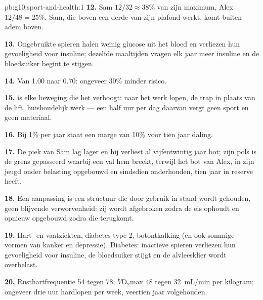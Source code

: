 \begin{solution}{pb:g10:sport-and-health:1}
\textbf{12.} Sam $12/32 \approx 38\%$ van zijn maximum, Alex $12/48 =
25\%$. Sam, die boven een derde van zijn plafond werkt, komt buiten adem
boven.

\textbf{13.} Ongebruikte spieren halen weinig glucose uit het bloed en
verliezen hun gevoeligheid voor insuline; dezelfde maaltijden vragen elk
jaar meer insuline en de bloedsuiker begint te stijgen.

\textbf{14.} Van 1.00 naar 0.70: ongeveer 30\% minder risico.

\textbf{15.}  is elke beweging die het 
verhoogt: naar het werk lopen, de trap in plaats van de lift,
huishoudelijk werk --- een half uur per dag daarvan vergt geen sport en
geen materiaal.

\textbf{16.} Bij 1\% per jaar staat een marge van 10\% voor tien jaar daling.

\textbf{17.} De piek van Sam lag lager en hij verliest al vijfentwintig
jaar bot; zijn pols is de grens gepasseerd waarbij een val hem breekt,
terwijl het bot van Alex, in zijn jeugd onder belasting opgebouwd en
sindsdien onderhouden, tien jaar in reserve heeft.

\textbf{18.} Een aanpassing is een structuur die door gebruik in stand
wordt gehouden, geen blijvende verworvenheid: zij wordt afgebroken zodra
de eis ophoudt en opnieuw opgebouwd zodra die terugkomt.

\textbf{19.} Hart- en vaatziekten, diabetes type 2, botontkalking (en ook
sommige vormen van kanker en depressie). Diabetes: inactieve spieren
verliezen hun gevoeligheid voor insuline, de bloedsuiker stijgt en de
alvleesklier wordt overbelast.

\textbf{20.} Rusthartfrequentie 54 tegen 78; $\dot V\!\mathrm{O_2}$max
\num{48} tegen \qty{32}{mL/min} per kilogram; ongeveer drie uur hardlopen
per week, veertien jaar volgehouden.
\end{solution}
